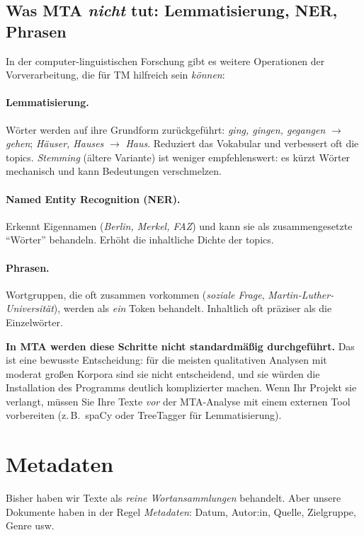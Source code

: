 \documentclass[a4paper,11pt]{article}
\begin{document}
\subsection{Was MTA \emph{nicht} tut: Lemmatisierung, NER, Phrasen}

In der computer-linguistischen Forschung gibt es weitere Operationen
der Vorverarbeitung, die für TM hilfreich sein \emph{können}:

\paragraph{Lemmatisierung.} Wörter werden auf ihre Grundform
zurückgeführt: \emph{ging, gingen, gegangen} $\to$ \emph{gehen};
\emph{Häuser, Hauses} $\to$ \emph{Haus}. Reduziert das Vokabular und
verbessert oft die topics. \emph{Stemming} (ältere Variante) ist
weniger empfehlenswert: es kürzt Wörter mechanisch und kann Bedeutungen
verschmelzen.

\paragraph{Named Entity Recognition (NER).} Erkennt Eigennamen
(\emph{Berlin, Merkel, FAZ}) und kann sie als zusammengesetzte
\enquote{Wörter} behandeln. Erhöht die inhaltliche Dichte der topics.

\paragraph{Phrasen.} Wortgruppen, die oft zusammen vorkommen
(\emph{soziale Frage}, \emph{Martin-Luther-Universität}), werden als
\emph{ein} Token behandelt. Inhaltlich oft präziser als die
Einzelwörter.

\textbf{In MTA werden diese Schritte nicht standardmäßig durchgeführt.}
Das ist eine bewusste Entscheidung: für die meisten qualitativen
Analysen mit moderat großen Korpora sind sie nicht entscheidend, und
sie würden die Installation des Programms deutlich komplizierter
machen. Wenn Ihr Projekt sie verlangt, müssen Sie Ihre Texte
\emph{vor} der MTA-Analyse mit einem externen Tool vorbereiten
(z.\,B.\ spaCy oder TreeTagger für Lemmatisierung).

\section{Metadaten}

Bisher haben wir Texte als \emph{reine Wortansammlungen} behandelt.
Aber unsere Dokumente haben in der Regel \emph{Metadaten}: Datum,
Autor:in, Quelle, Zielgruppe, Genre usw.
\end{document}
